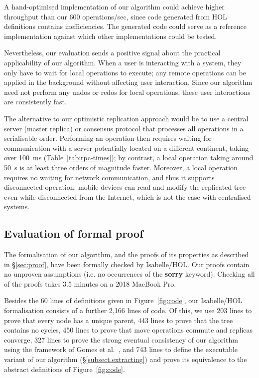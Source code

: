 \documentclass[sigplan,anonymous]{acmart}
\begin{document}
A hand-optimised implementation of our algorithm could achieve higher throughput than our 600 operations/sec, since code generated from HOL definitions contains inefficiencies.
The generated code could serve as a reference implementation against which other implementations could be tested.

Nevertheless, our evaluation sends a positive signal about the practical applicability of our algorithm.
When a user is interacting with a system, they only have to wait for local operations to execute; any remote operations can be applied in the background without affecting user interaction.
Since our algorithm need not perform any undos or redos for local operations, these user interactions are consistently fast.

The alternative to our optimistic replication approach would be to use a central server (master replica) or consensus protocol that processes all operations in a serialisable order.
Performing an operation then requires waiting for communication with a server potentially located on a different continent, taking over 100~ms (Table~\ref{tab:rpc-times}); by contrast, a local operation taking around 50~{\textmu}s is at least three orders of magnitude faster.
Moreover, a local operation requires no waiting for network communication, and thus it supports disconnected operation: mobile devices can read and modify the replicated tree even while disconnected from the Internet, which is not the case with centralised systems.

\subsection{Evaluation of formal proof}

The formalisation of our algorithm, and the proofs of its properties as described in \S\ref{sec:proof}, have been formally checked by Isabelle/HOL.
Our proofs contain no unproven assumptions (i.e. no occurrences of the \textbf{sorry} keyword).
Checking all of the proofs takes 3.5 minutes on a 2018 MacBook Pro.

Besides the 60 lines of definitions given in Figure~\ref{fig:code}, our Isabelle/HOL formalisation consists of a further 2,166 lines of code.
Of this, we use 203 lines to prove that every node has a unique parent, 443 lines to prove that the tree contains no cycles, 450 lines to prove that move operations commute and replicas converge, 327 lines to prove the strong eventual consistency of our algorithm using the framework of Gomes et al.~\cite{Gomes:2017gy}, and 743 lines to define the executable variant of our algorithm (\S\ref{subsect.extracting}) and prove its equivalence to the abstract definitions of Figure~\ref{fig:code}.
\end{document}
